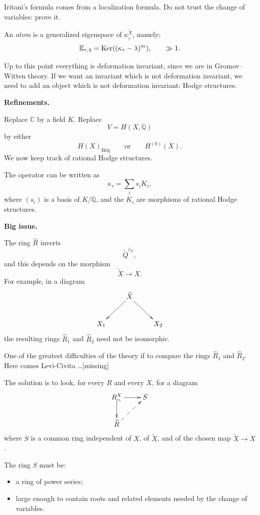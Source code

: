 \begin{remark}
\label{remark-iritani-s}
Iritani's formula comes from a
localization formula.
Do not trust the change of variables:
prove it.
\end{remark}

\begin{definition}
\label{definition-atom-generalized}
An {\it atom} is a generalized
eigenspace of
$\kappa_{\widetilde\tau}^{\widetilde X}$,
namely:
$$
\mathbb{E}_{\tau,\lambda}
=\mathop{\mathrm{Ker}} ((\kappa_\tau-\lambda)^m),
\qquad  \gg 1.
$$
\end{definition}

Up to this point everything is
deformation invariant, since we are in
Gromov--Witten theory.
If we want an invariant which is not
deformation invariant, we need to add
an object which is not deformation
invariant: Hodge structures.

\medskip\noindent
{\bf Refinements.}

Replace $\mathbb{C}$ by a field $K$.
Replace
\[
V=H(X,\mathbb{Q})
\]
by either
\[
H(X)_{\mathrm{Hdg}}
\qquad\text{or}\qquad
H^{(0)}(X).
\]
We now keep track of rational Hodge
structures.

The operator can be written as
\[
\kappa_\tau
=
\sum_i s_i K_i,
\]
where $(s_i)$ is a basis of
$K/\mathbb{Q}$, and the $K_i$ are
morphisms of rational Hodge
structures.

\medskip\noindent
{\bf Big issue.}

The ring $\widehat R$ inverts
\[
\widetilde Q^{\ell_E},
\]
and this depends on the morphism
\[
\widetilde X\to X.
\]
For example, in a diagram
\[
\xymatrix{
& \widetilde X \ar[dl]\ar[dr] &\\
X_1 && X_2
}
\]
the resulting rings
$\widehat R_1$ and $\widehat R_2$
need not be isomorphic.

\begin{remark}
\label{remark-difficulties-rings2}
One of the greatest difficulties of the
theory if to compare the rings
$\hat{R}_1$ and $\hat{R}_2$.
Here comes Levi-Civita …[missing]
\end{remark}

The solution is to look, for every
$R$ and every $X$, for a diagram
\[
\xymatrix{
R^X \ar[r]\ar@{^{(}->}[d] & S\\
\widehat R \ar@{-->}[ur] &
}
\]
where $S$ is a common ring independent
of $X$, of $\widetilde X$, and of the
chosen map $\widetilde X\to X$.

The ring $S$ must be:
\begin{itemize}
\item a ring of power series;
\item large enough to contain roots
and related elements needed by the
change of variables.
\end{itemize}

